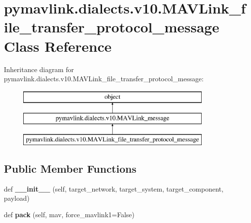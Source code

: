 \hypertarget{classpymavlink_1_1dialects_1_1v10_1_1MAVLink__file__transfer__protocol__message}{}\section{pymavlink.\+dialects.\+v10.\+M\+A\+V\+Link\+\_\+file\+\_\+transfer\+\_\+protocol\+\_\+message Class Reference}
\label{classpymavlink_1_1dialects_1_1v10_1_1MAVLink__file__transfer__protocol__message}
Inheritance diagram for pymavlink.\+dialects.\+v10.\+M\+A\+V\+Link\+\_\+file\+\_\+transfer\+\_\+protocol\+\_\+message\+:\begin{figure}[H]
\begin{center}
\leavevmode
\includegraphics[height=3.000000cm]{classpymavlink_1_1dialects_1_1v10_1_1MAVLink__file__transfer__protocol__message}
\end{center}
\end{figure}
\subsection*{Public Member Functions}
\begin{DoxyCompactItemize}
\item 
\mbox{\label{classpymavlink_1_1dialects_1_1v10_1_1MAVLink__file__transfer__protocol__message_a7b9562ac58f95e2256fd8097e19f4a4a}} 
def {\bfseries \+\_\+\+\_\+init\+\_\+\+\_\+} (self, target\+\_\+network, target\+\_\+system, target\+\_\+component, payload)
\item 
\mbox{\label{classpymavlink_1_1dialects_1_1v10_1_1MAVLink__file__transfer__protocol__message_aecd6cee599f13b32970f55b9e2c175c1}} 
def {\bfseries pack} (self, mav, force\+\_\+mavlink1=False)
\end{DoxyCompactItemize}
